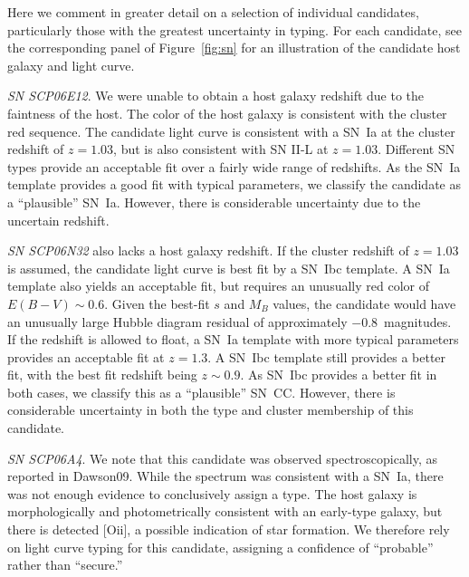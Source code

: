 
Here we comment in greater detail on a selection of individual
candidates, particularly those with the greatest uncertainty in
typing. For each candidate, see the corresponding panel of
Figure~\ref{fig:sn} for an illustration of the candidate host galaxy and
light curve.


{\it SN SCP06E12}. We were unable to obtain a host galaxy redshift due
to the faintness of the host. The color of the host galaxy is
consistent with the cluster red sequence. The candidate light curve is
consistent with a SN~Ia at the cluster redshift of $z=1.03$, but is
also consistent with SN II-L at $z=1.03$. Different SN types provide
an acceptable fit over a fairly wide range of redshifts. As the SN~Ia
template provides a good fit with typical parameters, we classify the
candidate as a ``plausible'' SN~Ia.  However, there is considerable
uncertainty due to the uncertain redshift.


{\it SN SCP06N32} also lacks a host galaxy redshift. If the cluster
redshift of $z=1.03$ is assumed, the candidate light curve is best fit
by a SN~Ibc template. A SN~Ia template also yields an acceptable
fit, but requires an unusually red color of $E(B-V) \sim 0.6$. Given
the best-fit $s$ and $M_B$ values, the candidate would have an
unusually large Hubble diagram residual of approximately
$-0.8$~magnitudes. If the redshift is allowed to float, a SN~Ia
template with more typical parameters provides an acceptable fit at $z
= 1.3$. A SN~Ibc template still provides a better fit, with the best
fit redshift being $z \sim 0.9$. As SN~Ibc
provides a better fit in both cases, we classify this as a ``plausible''
SN~CC. However, there is considerable uncertainty in
both the type and cluster membership of this candidate. 

{\it SN SCP06A4}. We note that this candidate was observed
spectroscopically, as reported in Dawson09. While the spectrum was
consistent with a SN~Ia, there was not enough evidence to
conclusively assign a type. The host galaxy is morphologically and
photometrically consistent with an early-type galaxy, but there is
detected [O{\sc ii}], a possible indication of star formation. We therefore
rely on light curve typing for this candidate, assigning a confidence
of ``probable'' rather than ``secure.''
 
